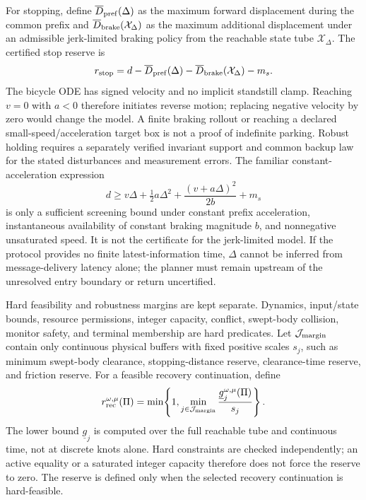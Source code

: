\documentclass[letterpaper]{article} %
\begin{document}
For stopping, define $\overline D_{\rm pref}(\Delta)$ as the maximum
forward displacement during the common prefix and
$\overline D_{\rm brake}(\mathcal X_\Delta)$ as the maximum
additional displacement under an admissible jerk-limited braking policy
from the reachable state tube $\mathcal X_\Delta$. The certified stop
reserve is
\begin{equation}
r_{\rm stop}=d-\overline D_{\rm pref}(\Delta)
-\overline D_{\rm brake}(\mathcal X_\Delta)-m_s.
\label{eq:stop}
\end{equation}
The bicycle ODE has signed velocity and no implicit standstill clamp.
Reaching $v=0$ with $a<0$ therefore initiates reverse motion; replacing
negative velocity by zero would change the model. A finite braking rollout
or reaching a declared small-speed/acceleration target box is not a proof of
indefinite parking. Robust holding requires a separately verified invariant
support and common backup law for the stated disturbances and measurement
errors. The familiar constant-acceleration expression
\begin{equation}
d\geq v\Delta+\tfrac12a\Delta^2+
\frac{(v+a\Delta)^2}{2b}+m_s
\label{eq:stop-special}
\end{equation}
is only a sufficient screening bound under constant prefix acceleration,
instantaneous availability of constant braking magnitude $b$, and
nonnegative unsaturated speed. It is not the certificate for the jerk-limited
model. If the protocol provides no finite latest-information time, $\Delta$
cannot be inferred from message-delivery latency alone; the planner must
remain upstream of the unresolved entry boundary or return uncertified.

Hard feasibility and robustness margins are kept separate. Dynamics,
input/state bounds, resource permissions, integer capacity, conflict,
swept-body collision, monitor safety, and terminal membership are hard
predicates. Let $\mathcal J_{\rm margin}$ contain only continuous physical
buffers with fixed positive scales $s_j$, such as minimum swept-body
clearance, stopping-distance reserve, clearance-time reserve, and friction
reserve. For a feasible recovery continuation, define
\begin{equation}
r_{\rm rec}^{\omega,\mu}(\Pi)=
\min\!\left\{1,\min_{j\in\mathcal J_{\rm margin}}
\frac{\underline g_j^{\omega,\mu}(\Pi)}{s_j}\right\}.
\label{eq:margin}
\end{equation}
The lower bound $\underline g_j$ is computed over the full reachable tube
and continuous time, not at discrete knots alone. Hard constraints are
checked independently; an active equality or a saturated integer capacity
therefore does not force the reserve to zero. The reserve is defined only
when the selected recovery continuation is hard-feasible.
\end{document}
